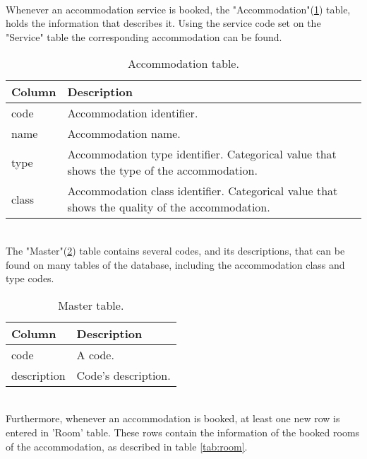 \\
Whenever an accommodation service is booked, the "Accommodation"(\ref{tab:accommodation}) table, holds the information that describes it. Using the service code set on the "Service" table the corresponding accommodation can be found. \\
\begin{table}[h!]
\begin{center}
\begin{tabular}{l | p{12cm}}
\hline\hline
\textbf{Column} & \textbf{Description}\\
\hline\hline
code & Accommodation identifier.\\
\hline
name & Accommodation name.\\
\hline
type & Accommodation type identifier. Categorical value that shows the type of the accommodation. \\
\hline
class & Accommodation class identifier. Categorical value that shows the quality of the accommodation. \\
\hline\hline
\end{tabular}
\caption{Accommodation table.}
\label{tab:accommodation}
\end{center}
\end{table}
\\
The "Master"(\ref{tab:master}) table contains several codes, and its descriptions, that can be found on many tables of the database, including the accommodation class and type codes. \\
\begin{table}[h!]
\begin{center}
\begin{tabular}{l | p{12cm}}
\hline\hline
\textbf{Column} & \textbf{Description}\\
\hline\hline
code & A code.\\
\hline
description & Code's description.\\
\hline\hline
\end{tabular}
\caption{Master table.}
\label{tab:master}
\end{center}
\end{table}
\\
Furthermore, whenever an accommodation is booked, at least one new row is entered in 'Room' table. These rows contain the information of the booked rooms of the accommodation, as described in table \ref{tab:room}. \\

